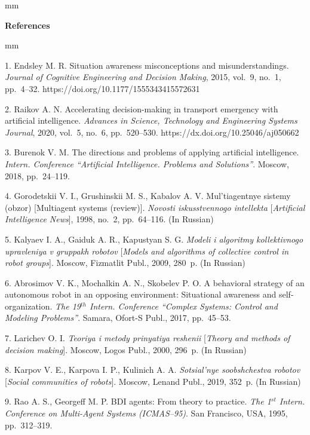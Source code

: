 

{\small



 mm

\noindent \textbf{References} }

 mm

{\footnotesize



1. Endsley M. R. Situation awareness misconceptions and misunderstandings. \textit{Journal of Cognitive Engineering and Decision Making}, 2015, vol.~9, no.~1, pp.~4--32. https://doi.org/10.1177/1555343415572631

2. Raikov A. N. Accelerating decision-making in transport emergency with artificial intelligence. \textit{Advances in Science, Technology and Engineering Systems Journal}, 2020, vol.~5, no.~6, pp.~520--530. https://dx.doi.org/10.25046/aj050662

3. Burenok V. M. The directions and problems of applying artificial intelligence. \textit{Intern. Con\-fe\-ren\-ce ``Artificial Intelligence. Problems and Solutions''}. Moscow, 2018, pp.~24--119.

4. Gorodetskii V. I., Grushinskii M. S., Kabalov A. V. Mul'tiagentnye sistemy (obzor) [Multiagent systems (review)]. \textit{Novosti iskusstvennogo intellekta} [\textit{Artificial Intelligence News}], 1998, no.~2, pp.~64--116. (In Russian)

5. Kalyaev I. A., Gaiduk A. R., Kapustyan S. G. \textit{Modeli i algoritmy kollektivnogo upravleniya v gruppakh robotov} [\textit{Models and algorithms of collective control in robot groups}]. Moscow, Fizmatlit Publ., 2009, 280~p. (In Russian)

6. Abrosimov V. K.,	Mochalkin A. N., Skobelev P. O. A behavioral strategy of an autonomous robot in an opposing environment: Situational awareness and self-organization. \textit{The 19$^{th}$ Intern. Conference ``Complex Systems: Control and Modeling Problems''}. Samara, Ofort-S Publ., 2017, pp.~45--53.

7. Larichev O. I. \textit{Teoriya i metody prinyatiya reshenii} [\textit{Theory and methods of decision making}]. Moscow, Logos Publ., 2000, 296~p. (In Russian)

8. Karpov V. E., Karpova I. P., Kulinich A. A. \textit{Sotsial'nye soobshchestva robotov} [\textit{Social communities of robots}]. Moscow, Lenand Publ., 2019, 352~p. (In Russian)

9. Rao A. S., Georgeff M. P. BDI agents: From theory to practice. \textit{The 1$^{st}$ Intern. Conference on Multi-Agent Systems (ICMAS--95)}. San Francisco, USA, 1995, pp.~312--319.

}
